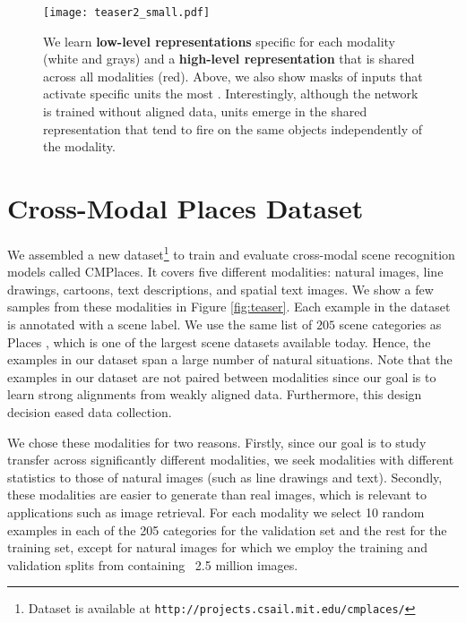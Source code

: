 \documentclass[10pt,journal,compsoc]{IEEEtran}
\begin{document}
    \begin{figure*}
         \centering
    	\texttt{[image: teaser2\_small.pdf]}
    	\caption{We learn \textbf{low-level representations} specific for each modality (white and grays) and a  \textbf{high-level representation} that is shared across all modalities (red). Above, we also show masks of inputs that activate specific units the most  \cite{zhou2014object}. Interestingly, although the network is trained without aligned data, units emerge in the shared representation that tend to fire on the same objects independently of the modality.} 
    	\label{fig:figure_02}
    \end{figure*}

        
\section{Cross-Modal Places Dataset} 
\label{sec:dataset}

    We assembled a new dataset\footnote{Dataset is available at \texttt{http://projects.csail.mit.edu/cmplaces/}} to train and evaluate cross-modal scene recognition models called CMPlaces. It covers five different modalities: natural images, line drawings, cartoons, text descriptions, and spatial text images. We show a few samples from these modalities in Figure \ref{fig:teaser}. Each example in the dataset is annotated with a scene label. We use the same list of $205$ scene categories as Places \cite{zhou2014learning}, which is one of the largest scene datasets available today. Hence, the examples in our dataset span a large number of natural situations. Note that the examples in our dataset are not paired between modalities since our goal is to learn strong alignments from weakly aligned data. Furthermore, this design decision eased data collection.
    
    We chose these modalities for two reasons. Firstly, since our goal is to study transfer across significantly different modalities, we seek modalities with different statistics to those of natural images (such as line drawings and text). Secondly, these modalities are easier to generate than real images, which is relevant to applications such as image retrieval. For each modality we select 10 random examples in each of the 205 categories for the validation set and the rest for the training set, except for natural images for which we employ the training and validation splits from \cite{zhou2014learning} containing ~2.5 million images.
    
\end{document}
